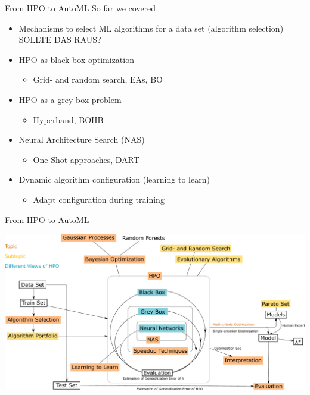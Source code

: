 

\usepackage{ulem}
\usepackage{pifont}

\subtitle{Wrap Up}




\maketitle



\begin{frame}{From HPO to AutoML}
  So far we covered
  \begin{itemize}
    \item Mechanisms to select ML algorithms for a data set (algorithm selection)
        SOLLTE DAS RAUS?
    \item HPO as black-box optimization
    \begin{itemize}
      \item Grid- and random search, EAs, BO
    \end{itemize}
    \item HPO as a grey box problem
    \begin{itemize}
      \item Hyperband, BOHB
    \end{itemize}
    \item Neural Architecture Search (NAS)
    \begin{itemize}
      \item One-Shot approaches, DART
    \end{itemize}
    \item Dynamic algorithm configuration (learning to learn)
    \begin{itemize}
      \item Adapt configuration during training
    \end{itemize}
  \end{itemize}  
\end{frame}

\begin{frame}{From HPO to AutoML}
    \begin{center}
      \includegraphics[width = 0.9\linewidth]{images/drawing.pdf}  
    \end{center}
\end{frame}

